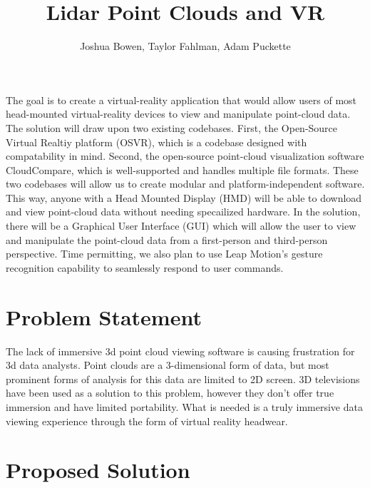\documentclass{article}
\begin{document}
\title{Lidar Point Clouds and VR}
\author{Joshua Bowen, Taylor Fahlman, Adam Puckette}

\maketitle

\abstract

The goal is to create a virtual-reality application that would allow users of most head-mounted virtual-reality devices to view and manipulate point-cloud data. The solution will draw upon two existing codebases. First, the Open-Source Virtual Realtiy platform (OSVR), which is a codebase designed with compatability in mind. Second, the open-source point-cloud visualization software CloudCompare, which is well-supported and handles multiple file formats. These two codebases will allow us to create modular and platform-independent software. This way, anyone with a Head Mounted Display (HMD) will be able to download and view point-cloud data without needing specailized hardware. In the solution, there will be a Graphical User Interface (GUI) which will allow the user to view and manipulate the point-cloud data from a first-person and third-person perspective. Time permitting, we also plan to use Leap Motion's gesture recognition capability to seamlessly respond to user commands.

\vfill
\section*{Problem Statement}

The lack of immersive 3d point cloud viewing software is causing frustration for 3d data analysts. Point clouds are a 3-dimensional form of data, but most prominent forms of analysis for this data are limited to 2D screen. 3D televisions have been used as a solution to this problem, however they don't offer true immersion and have limited portability. What is needed is a truly immersive data viewing experience through the form of virtual reality headwear.

\section*{Proposed Solution}
\end{document}

